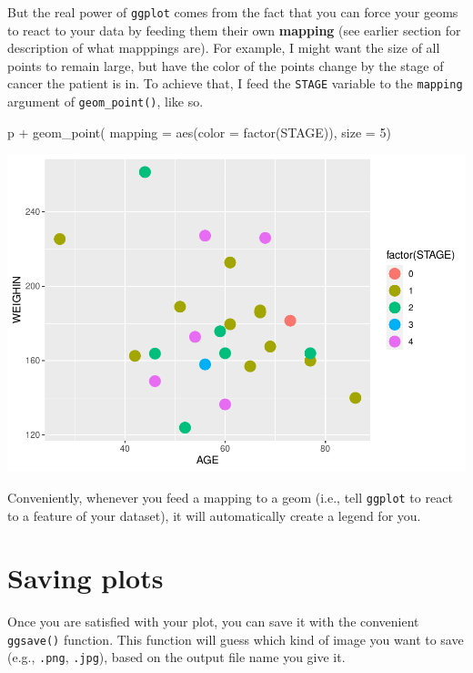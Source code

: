 \documentclass[
]{book}
\newenvironment{Shaded}{\begin{snugshade}}{\end{snugshade}}
\newcommand{\AttributeTok}[1]{\textcolor[rgb]{0.77,0.63,0.00}{#1}}
\newcommand{\DecValTok}[1]{\textcolor[rgb]{0.00,0.00,0.81}{#1}}
\newcommand{\FunctionTok}[1]{\textcolor[rgb]{0.00,0.00,0.00}{#1}}
\newcommand{\NormalTok}[1]{#1}
\newcommand{\SpecialCharTok}[1]{\textcolor[rgb]{0.00,0.00,0.00}{#1}}
\begin{document}
But the real power of \texttt{ggplot} comes from the fact that you can force your geoms to react to your data by feeding them their own \textbf{mapping} (see earlier section for description of what mapppings are). For example, I might want the size of all points to remain large, but have the color of the points change by the stage of cancer the patient is in. To achieve that, I feed the \texttt{STAGE} variable to the \texttt{mapping} argument of \texttt{geom\_point()}, like so.

\begin{Shaded}
\begin{Highlighting}[]
\NormalTok{p }\SpecialCharTok{+}
  \FunctionTok{geom\_point}\NormalTok{(}
    \AttributeTok{mapping =} \FunctionTok{aes}\NormalTok{(}\AttributeTok{color =} \FunctionTok{factor}\NormalTok{(STAGE)),}
    \AttributeTok{size =} \DecValTok{5}\NormalTok{)}
\end{Highlighting}
\end{Shaded}

\includegraphics{_main_files/figure-latex/unnamed-chunk-94-1.pdf}

Conveniently, whenever you feed a mapping to a geom (i.e., tell \texttt{ggplot} to react to a feature of your dataset), it will automatically create a legend for you.

\hypertarget{saving-plots}{%
\section{Saving plots}\label{saving-plots}}

Once you are satisfied with your plot, you can save it with the convenient \texttt{ggsave()} function. This function will guess which kind of image you want to save (e.g., \texttt{.png}, \texttt{.jpg}), based on the output file name you give it.
\end{document}
